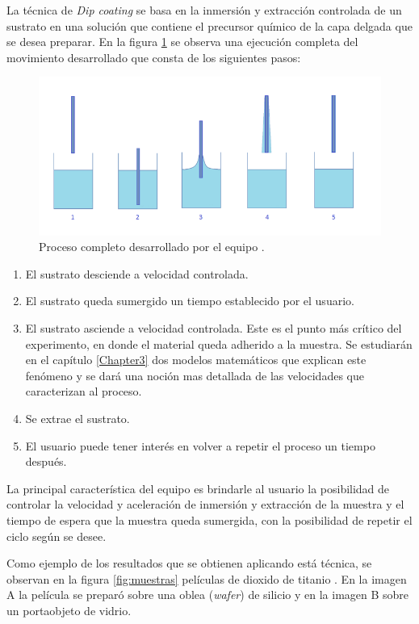 La técnica de \textit{Dip coating} se basa en la inmersión y extracción  controlada de un sustrato en una solución que contiene el precursor químico de la capa delgada que se desea preparar. En la figura \ref{fig:inmersion} se observa una ejecución completa del movimiento desarrollado que consta de los siguientes pasos:


\begin{figure}[htpb]
\centering 
\includegraphics[width=1\textwidth]{./Figures/dip-coating.png}
\caption{Proceso completo desarrollado por el equipo \protect\footnotemark.}
\label{fig:inmersion}
\end{figure}

\begin{enumerate}
\item El sustrato desciende a velocidad controlada.
\item El sustrato queda sumergido un tiempo establecido por el usuario.	
\item El sustrato asciende a velocidad controlada. Este es el punto más crítico del experimento, en donde el material queda adherido a la muestra. Se estudiarán en el capítulo \ref{Chapter3} dos modelos matemáticos que explican este fenómeno y se dará una noción mas detallada de las velocidades que caracterizan al proceso.
\item Se extrae el sustrato.
\item El usuario puede tener interés en volver a repetir el proceso un tiempo después.
\end{enumerate} 
 
La principal característica del equipo es brindarle al usuario la posibilidad de controlar la velocidad y aceleración de inmersión y extracción de la muestra y el tiempo de espera que la muestra queda sumergida, con la posibilidad de repetir el ciclo según se desee.

Como ejemplo de los resultados que se obtienen aplicando está técnica, se observan en la figura \ref{fig:muestras} películas de dioxido de titanio . En la imagen A la película se preparó sobre una oblea (\textit{wafer}) de silicio y en la imagen B sobre un portaobjeto de vidrio.


